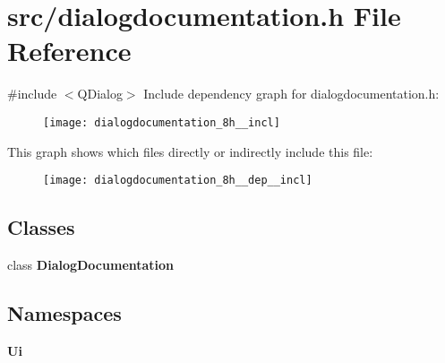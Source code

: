 \section{src/dialogdocumentation.h File Reference}
\label{dialogdocumentation_8h}
{\ttfamily \#include $<$Q\+Dialog$>$}\newline
Include dependency graph for dialogdocumentation.\+h\+:\nopagebreak
\begin{figure}[H]
\begin{center}
\leavevmode
\texttt{[image: dialogdocumentation\_8h\_\_incl]}
\end{center}
\end{figure}
This graph shows which files directly or indirectly include this file\+:
\nopagebreak
\begin{figure}[H]
\begin{center}
\leavevmode
\texttt{[image: dialogdocumentation\_8h\_\_dep\_\_incl]}
\end{center}
\end{figure}
\subsection*{Classes}
\begin{DoxyCompactItemize}
\item 
class \textbf{ Dialog\+Documentation}
\end{DoxyCompactItemize}
\subsection*{Namespaces}
\begin{DoxyCompactItemize}
\item 
 \textbf{ Ui}
\end{DoxyCompactItemize}
